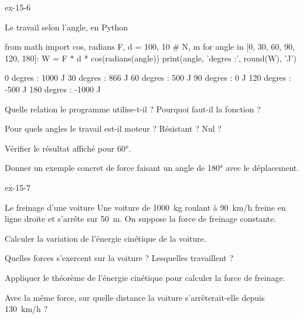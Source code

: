 \begin{blocLivre}{ex-15-6}
\begin{exercice}[2]{Le travail selon l'angle, en Python}
\begin{python}
from math import cos, radians
F, d = 100, 10                     # N, m
for angle in [0, 30, 60, 90, 120, 180]:
    W = F * d * cos(radians(angle))
    print(angle, 'degres :', round(W), 'J')
\end{python}
\begin{console}
0 degres : 1000 J
30 degres : 866 J
60 degres : 500 J
90 degres : 0 J
120 degres : -500 J
180 degres : -1000 J
\end{console}
\begin{questions}
\item {}Quelle relation le programme utilise-t-il ? Pourquoi faut-il la fonction  ?
\item Pour quels angles le travail est-il moteur ? Résistant ? Nul ?
\item Vérifier le résultat affiché pour \ang{60}.
\item Donner un exemple concret de force faisant un angle de \ang{180} avec le déplacement.
\end{questions}
\end{exercice}
\end{blocLivre}
\begin{blocLivre}{ex-15-7}
\begin{exercice}[2]{Le freinage d'une voiture}
Une voiture de \qty{1000}{kg} roulant à \qty{90}{km/h} freine en ligne droite et s'arrête sur \qty{50}{m}. On suppose la force de freinage constante.
\begin{questions}
\item Calculer la variation de l'énergie cinétique de la voiture.
\item Quelles forces s'exercent sur la voiture ? Lesquelles travaillent ?
\item Appliquer le théorème de l'énergie cinétique pour calculer la force de freinage.
\item Avec la même force, sur quelle distance la voiture s'arrêterait-elle depuis \qty{130}{km/h} ?
\end{questions}
\end{exercice}
\end{blocLivre}
